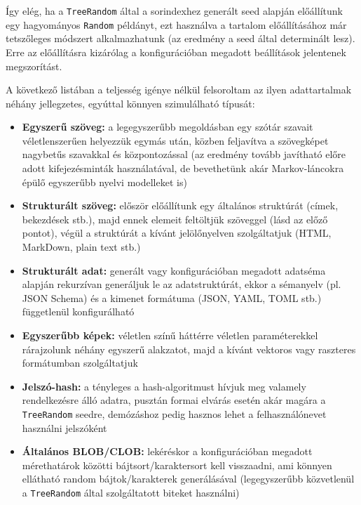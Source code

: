 \documentclass[
    parspace,
    noindent,
    nohyp,
]{elteiktdk}[2023/04/10]
\begin{document}
Így elég, ha a \texttt{TreeRandom} által a sorindexhez generált seed alapján
előállítunk egy hagyományos \texttt{Random} példányt,
ezt használva a tartalom előállításához már tetszőleges módszert alkalmazhatunk
(az eredmény a seed által determinált lesz).
Erre az előállításra kizárólag a konfigurációban megadott beállítások jelentenek megszorítást.

A következő listában a teljesség igénye nélkül felsoroltam
az ilyen adattartalmak néhány jellegzetes,
egyúttal könnyen szimulálható típusát:

\begin{itemize}
  \item \textbf{Egyszerű szöveg:}
    a legegyszerűbb megoldásban egy szótár szavait véletlenszerűen helyezzük egymás után,
    közben feljavítva a szövegképet nagybetűs szavakkal és központozással
    (az eredmény tovább javítható előre adott kifejezésminták használatával,
    de bevethetünk akár Markov-láncokra épülő egyszerűbb nyelvi modelleket
    is\cite{Amrrs2021MarkovHeadlines})
  \item \textbf{Strukturált szöveg:}
    először előállítunk egy általános struktúrát (címek, bekezdések stb.),
    majd ennek elemeit feltöltjük szöveggel (lásd az előző pontot),
    végül a struktúrát a kívánt jelölőnyelven szolgáltatjuk (HTML, MarkDown, plain text stb.)
  \item \textbf{Strukturált adat:}
    generált vagy konfigurációban megadott adatséma alapján rekurzívan generáljuk le az adatstruktúrát,
    ekkor a sémanyelv (pl. JSON Schema) és a kimenet formátuma (JSON, YAML, TOML stb.)
    függetlenül konfigurálható
  \item \textbf{Egyszerűbb képek:}
    véletlen színű háttérre véletlen paraméterekkel
    rárajzolunk néhány egyszerű alakzatot,
    majd a kívánt vektoros vagy raszteres formátumban szolgáltatjuk
  \item \textbf{Jelszó-hash:}
    a tényleges a hash-algoritmust hívjuk meg valamely rendelkezésre álló adatra,
    pusztán formai elvárás esetén akár magára a \texttt{TreeRandom} seedre,
    demózáshoz pedig hasznos lehet a felhasználónevet használni jelszóként
  \item \textbf{Általános BLOB/CLOB:}
    lekéréskor a konfigurációban megadott mérethatárok közötti bájtsort/karaktersort kell visszaadni,
    ami könnyen ellátható random bájtok/karakterek generálásával
    (legegyszerűbb közvetlenül a \texttt{TreeRandom} által szolgáltatott biteket használni)
\end{itemize}
\end{document}
